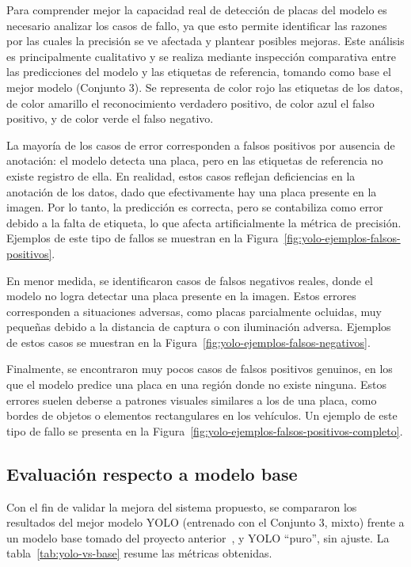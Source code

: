 Para comprender mejor la capacidad real de detección de placas del modelo 
es necesario analizar los casos de fallo, ya que esto permite identificar 
las razones por las cuales la precisión se ve afectada y plantear posibles mejoras.
Este análisis es principalmente cualitativo y se realiza mediante inspección comparativa
entre las predicciones del modelo y las etiquetas de referencia,
tomando como base el mejor modelo (Conjunto 3). 
Se representa de color rojo las etiquetas de los datos, de color amarillo
el reconocimiento verdadero positivo, de color azul el falso positivo,
y de color verde el falso negativo.

La mayoría de los casos de error corresponden a falsos positivos por ausencia de anotación:
el modelo detecta una placa, pero en las etiquetas de referencia no existe registro de ella.
En realidad, estos casos reflejan deficiencias en la anotación de los datos,
dado que efectivamente hay una placa presente en la imagen.
Por lo tanto, la predicción es correcta, pero se contabiliza como error debido a la falta de etiqueta,
lo que afecta artificialmente la métrica de precisión.
Ejemplos de este tipo de fallos se muestran en la Figura~\ref{fig:yolo-ejemplos-falsos-positivos}.

En menor medida, se identificaron casos de falsos negativos reales,
donde el modelo no logra detectar una placa presente en la imagen.
Estos errores corresponden a situaciones adversas, como placas parcialmente ocluidas,
muy pequeñas debido a la distancia de captura o con iluminación adversa.
Ejemplos de estos casos se muestran en la Figura~\ref{fig:yolo-ejemplos-falsos-negativos}.

Finalmente, se encontraron muy pocos casos de falsos positivos genuinos,
en los que el modelo predice una placa en una región donde no existe ninguna.
Estos errores suelen deberse a patrones visuales similares a los de una placa, 
como bordes de objetos o elementos rectangulares en los vehículos.
Un ejemplo de este tipo de fallo se presenta en la Figura~\ref{fig:yolo-ejemplos-falsos-positivos-completo}.

\subsection{Evaluación respecto a modelo base}

Con el fin de validar la mejora del sistema propuesto,
se compararon los resultados del mejor modelo YOLO (entrenado con el Conjunto 3, mixto)
frente a un modelo base tomado del proyecto anterior~\cite{proyecto_previo},
y YOLO ``puro'', sin ajuste. La tabla~\ref{tab:yolo-vs-base} resume las métricas obtenidas.

